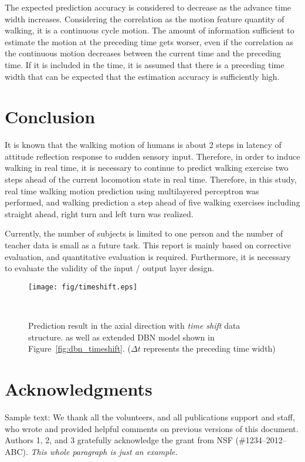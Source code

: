 \documentclass{sigchi}
\begin{document}
The expected prediction accuracy is considered to decrease as the advance time width increases. Considering the correlation as the motion feature quantity of walking, it is a continuous cycle motion. The amount of information sufficient to estimate the motion at the preceding time gets worser, even if the correlation as the continuous motion decreases between the current time and the preceding time. If it is included in the time, it is assumed that there is a preceding time width that can be expected that the estimation accuracy is sufficiently high. 



\section{Conclusion}
It is known that the walking motion of humans is about 2 steps in latency of attitude reflection response to sudden sensory input. Therefore, in order to induce walking in real time, it is necessary to continue to predict walking exercise two steps ahead of the current locomotion state in real time. Therefore, in this study, real time walking motion prediction using multilayered perceptron was performed, and walking prediction a step ahead of five walking exercises including straight ahead, right turn and left turn was realized.

Currently, the number of subjects is limited to one person and the number of teacher data is small as a future task. This report is mainly based on corrective evaluation, and quantitative evaluation is required. Furthermore, it is necessary to evaluate the validity of the input / output layer design.

\begin{figure*}
\centering
  \texttt{[image: fig/timeshift.eps]}
  \caption{Prediction result in the axial direction with \textit{time shift} data structure. as well as extended DBN model shown in Figure~\ref{fig:dbn_timeshift}. ($ \Delta t $ represents the preceding time width)}
  ~\label{fig:timeshift}
\end{figure*}



\section{Acknowledgments}
Sample text: We thank all the volunteers, and all publications support
and staff, who wrote and provided helpful comments on previous
versions of this document. Authors 1, 2, and 3 gratefully acknowledge
the grant from NSF (\#1234--2012--ABC). \textit{This whole paragraph is
  just an example.}


\balance{}



\end{document}
